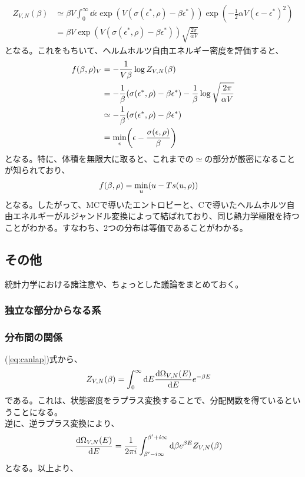 \documentclass[a4paper,11pt]{jsarticle}
\numberwithin{equation}{section}
\begin{document}
\begin{align}
  Z_{V,N}(\beta) &\simeq \beta V \int_{0}^{\infty}\dd \epsilon \exp(V(\sigma(\epsilon^{*},\rho)-\beta \epsilon^{*})) \exp(-\frac{1}{2}\alpha V(\epsilon-\epsilon^{*})^2)\\
  &= \beta V \exp(V(\sigma(\epsilon^{*},\rho)-\beta \epsilon^{*}))\sqrt{\frac{2\pi}{\alpha V}}
\end{align}
となる。これをもちいて、ヘルムホルツ自由エネルギー密度を評価すると、
\begin{align}
  f(\beta,\rho)_V &= -\frac{1}{V\beta}\log Z_{V,N}(\beta)\\
  &= -\frac{1}{\beta}(\sigma(\epsilon^{*},\rho) -\beta \epsilon^{*} ) -\frac{1}{\beta}\log \sqrt{\frac{2\pi}{\alpha V}}\\
  &\simeq -\frac{1}{\beta}(\sigma(\epsilon^{*},\rho) -\beta \epsilon^{*} ) \\
  &= \underset{\epsilon}{\min} \qty(\epsilon - \frac{\sigma(\epsilon,\rho)}{\beta})
\end{align}
となる。特に、体積を無限大に取ると、これまでの$\simeq$の部分が厳密になることが知られており、
\begin{align}
  f(\beta,\rho) &= \underset{u}{\min} \qty(u - Ts(u,\rho))
\end{align}
となる。したがって、MCで導いたエントロピーと、Cで導いたヘルムホルツ自由エネルギーがルジャンドル変換によって結ばれており、同じ熱力学極限を持つことがわかる。すなわち、2つの分布は等価であることがわかる。\hfill\qedsymbol\\







\subsection{その他}
統計力学における諸注意や、ちょっとした議論をまとめておく。\\

\subsubsection{独立な部分からなる系}

\subsubsection{分布間の関係}
(\ref{eq:canlap})式から、
\begin{align}
  Z_{V,N}(\beta) &= \int_{0}^{\infty}\dd E \dv{\Omega_{V,N}(E)}{E}e^{-\beta E}
\end{align}
である。これは、状態密度をラプラス変換することで、分配関数を得ているということになる。\\
逆に、逆ラプラス変換により、
\begin{align}
  \dv{\Omega_{V,N}(E)}{E} &= \frac{1}{2\pi i}\int_{\beta' - i\infty}^{\beta' + i\infty}\dd \beta e^{\beta E}Z_{V,N}(\beta)
\end{align}
となる。以上より、
\end{document}
